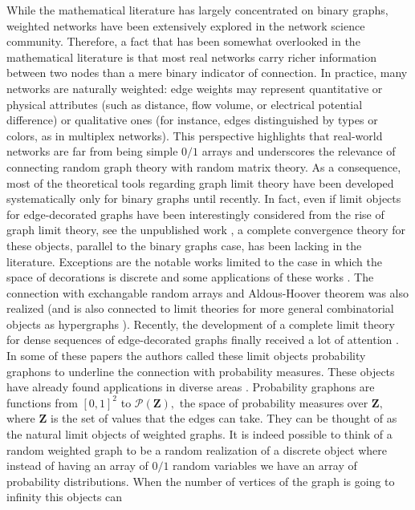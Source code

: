 \documentclass[12pt,twoside,a4paper]{article}
\newcommand{\Space}{\mathbf{Z}}
\begin{document}
While the mathematical literature has largely concentrated on binary graphs, weighted networks have been extensively explored in the network science community. Therefore, a fact that has been somewhat overlooked in the mathematical literature is that most real networks carry richer information between two nodes than a mere binary indicator of connection. In practice, many networks are naturally weighted: edge weights may represent quantitative or physical attributes (such as distance, flow volume, or electrical potential difference) or qualitative ones (for instance, edges distinguished by types or colors, as in multiplex networks). This perspective highlights that real-world networks are far from being simple $0/1$ arrays and underscores the relevance of connecting random graph theory with random matrix theory. As a consequence, most of the theoretical tools regarding graph limit theory have been developed systematically only for binary graphs until recently. In fact, even if limit objects for edge-decorated graphs have been interestingly considered from the rise of graph limit theory, see the unpublished work \cite{lovász2010limits}, a complete convergence theory for these objects, parallel to the binary graphs case, has been lacking in the literature. Exceptions are the notable works \cite{falgasravry2016multicolour,rath2011multigraph} limited to the case in which the space of decorations is discrete and some applications of these works \cite{rath2012Configmultigraph,rath2012time}. The connection with exchangable random arrays and Aldous-Hoover theorem \cite{kallenberg1992symmetries, hoover1979relations, aldous1981representations, aldous2010exchangeability,austin2008exchangeable,diaconis2007graph} was also realized (and is also connected to limit theories for more general combinatorial objects as hypergraphs \cite{hypergrELEK20121731,HypergraphsSzegedy2,HypergraphonsZhao,zucal2023action,zucal2024probabilitygraphonspvariablesequivalent}). Recently, the development of a complete limit theory for dense sequences of edge-decorated graphs finally received a lot of attention \cite{abraham2023probabilitygraphons,zucal2024probabilitygraphonsrightconvergence,zucal2024probabilitygraphonspvariablesequivalent,athreya2023pathconvergencemarkovchains,KUNSZENTIKOVACS2022109284}. In some of these papers the authors called these limit objects probability graphons \cite{abraham2023probabilitygraphons,zucal2024probabilitygraphonsrightconvergence,zucal2024probabilitygraphonspvariablesequivalent} to underline the connection with probability measures. These objects have already found applications in diverse areas \cite{dufour2024inferencedecoratedgraphsapplication,andrade2025monochromaticsubgraphsrandomlycolored,ganguly2025meanfieldanalysislatentvariable}. Probability graphons are functions from $[0,1]^2$ to $\mathcal{P}(\Space),$ the space of probability measures over $\Space,$ where $\Space$ is the set of values that the edges can take. They can be thought of as the natural limit objects of weighted graphs. It is indeed possible to think of a random weighted graph to be a random realization of a discrete object where instead of having an array of $0/1$ random variables we have an array of probability distributions. When the number of vertices of the graph is going to infinity this objects can 
\end{document}
